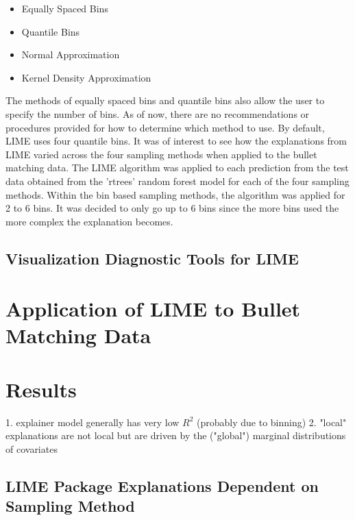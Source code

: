 \documentclass[AMS,STIX2COL]{WileyNJD-v2}
\begin{document}
\begin{itemize}
\item Equally Spaced Bins
\item Quantile Bins
\item Normal Approximation
\item Kernel Density Approximation
\end{itemize}

The methods of equally spaced bins and quantile bins also allow the user to specify the number of bins. As of now, there are no recommendations or procedures provided for how to determine which method to use. By default, LIME uses four quantile bins. It was of interest to see how the explanations from LIME varied across the four sampling methods when applied to the bullet matching data. The LIME algorithm was applied to each prediction from the test data obtained from the 'rtrees' random forest model for each of the four sampling methods. Within the bin based sampling methods, the algorithm was applied for 2 to 6 bins. It was decided to only go up to 6 bins since the more bins used the more complex the explanation becomes.

\subsection{Visualization Diagnostic Tools for LIME}

\section{Application of LIME to Bullet Matching Data}

\section{Results}

1. explainer model generally has very low $R^2$ (probably due to binning)
2. "local" explanations are not local but are driven by the ("global") marginal distributions of covariates

\subsection{LIME Package Explanations Dependent on Sampling Method}
\end{document}
